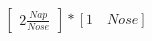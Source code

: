 \documentclass[preview]{standalone}
\begin{document}
\begin{align*}
\begin{bmatrix} 2 \frac{Nap}{Nose} \end{bmatrix} * [1 \quad Nose]
\end{align*}
\end{document}
